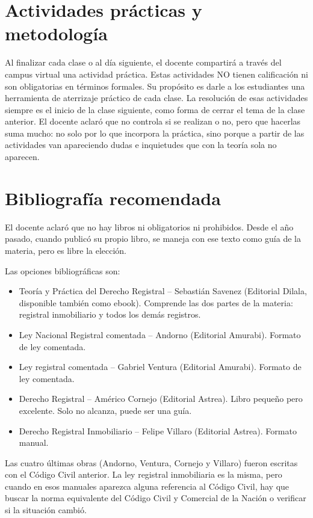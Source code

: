\documentclass[12pt,oneside]{book}
\begin{document}
\section{Actividades prácticas y metodología}
\label{sec:actividades-practicas}

Al finalizar cada clase o al día siguiente, el docente compartirá a través del campus virtual una actividad práctica. Estas actividades NO tienen calificación ni son obligatorias en términos formales. Su propósito es darle a los estudiantes una herramienta de aterrizaje práctico de cada clase. La resolución de esas actividades siempre es el inicio de la clase siguiente, como forma de cerrar el tema de la clase anterior. El docente aclaró que no controla si se realizan o no, pero que hacerlas suma mucho: no solo por lo que incorpora la práctica, sino porque a partir de las actividades van apareciendo dudas e inquietudes que con la teoría sola no aparecen.

\section{Bibliografía recomendada}
\label{sec:bibliografia-recomendada}

El docente aclaró que no hay libros ni obligatorios ni prohibidos. Desde el año pasado, cuando publicó su propio libro, se maneja con ese texto como guía de la materia, pero es libre la elección.

Las opciones bibliográficas son:

\begin{itemize}
    \item Teoría y Práctica del Derecho Registral -- Sebastián Savenez (Editorial Dilala, disponible también como ebook). Comprende las dos partes de la materia: registral inmobiliario y todos los demás registros.
    \item Ley Nacional Registral comentada -- Andorno (Editorial Amurabi). Formato de ley comentada.
    \item Ley registral comentada -- Gabriel Ventura (Editorial Amurabi). Formato de ley comentada.
    \item Derecho Registral -- Américo Cornejo (Editorial Astrea). Libro pequeño pero excelente. Solo no alcanza, puede ser una guía.
    \item Derecho Registral Inmobiliario -- Felipe Villaro (Editorial Astrea). Formato manual.
\end{itemize}

\begin{important}
Las cuatro últimas obras (Andorno, Ventura, Cornejo y Villaro) fueron escritas con el Código Civil anterior. La ley registral inmobiliaria es la misma, pero cuando en esos manuales aparezca alguna referencia al Código Civil, hay que buscar la norma equivalente del Código Civil y Comercial de la Nación o verificar si la situación cambió.
\end{important}
\end{document}
